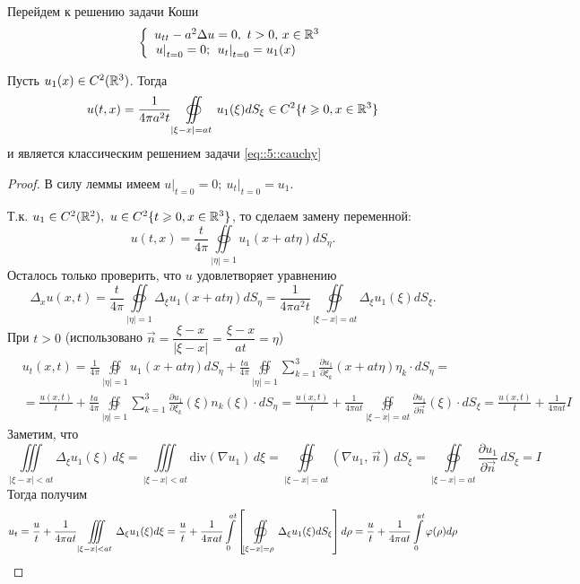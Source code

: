 \documentclass[../main.tex]{subfiles}
\begin{document}
Перейдем к решению задачи Коши
\begin{equation}
\left\{
  \begin{array}{ll}
  u_{tt}-a^2\Delta u=0,\ t>0,\, x\in \R^3\\
  \left. u\right|_{t=0}=0;\ \left. u_t\right|_{t=0}=u_1(x)
  \end{array}
\right.
\label{eq::5::cauchy}
\end{equation}
\begin{theorem}
Пусть $u_1(x)\in C^2(\R^3)$. Тогда 
\[
u(t,x)=\frac{1}{4\pi a^2t}\oiint\limits_{|\xi - x|=at}u_1(\xi )dS_{\xi}\in C^2\{t\geq 0, x\in \R^3 \}
\]
и является классическим решением задачи \eqref{eq::5::cauchy}
\end{theorem}
\begin{proof}
В силу леммы имеем $\left. u\right|_{t=0}=0;\ \left. u_t\right|_{t=0}=u_1$.

Т.к. $u_1\in C^2(\R^2),\ u\in C^2\{t\geq 0, x\in\R^3\}$, то сделаем замену переменной:
\[
u(t, x)=\frac{t}{4\pi}\oiint\limits_{|\eta |=1}u_1(x+at\eta )dS_{\eta}.
\]
Осталось только проверить, что $u$ удовлетворяет уравнению
\[
\Delta_xu(x, t)=\frac{t}{4\pi}\oiint\limits_{|\eta |=1}\Delta_{\xi}u_1(x+at\eta )dS_{\eta}=\frac{1}{4\pi a^2t}\oiint\limits_{|\xi - x|=at}\Delta_{\xi}u_1(\xi )dS_{\xi}.
\]
При $t>0$ (использовано $\vec{n}=\dfrac{\xi - x}{|\xi - x|}=\dfrac{\xi - x}{at}=\eta$)
\begin{equation*}
\begin{split}
&u_t(x,t)=\frac{1}{4\pi}\oiint\limits_{|\eta |=1}u_1(x+at\eta )dS_{\eta}+\frac{ta}{4\pi}\oiint\limits_{|\eta |=1}\sum\limits_{k=1}^3 \frac{\partial u_1}{\partial \xi_k}(x+at\eta )\eta_k\cdot dS_{\eta}=\\[0.75em]
&=\frac{u(x, t)}{t}+\frac{ta}{4\pi}\oiint\limits_{|\eta |=1}\sum\limits_{k=1}^3 \frac{\partial u_1}{\partial \xi_k}(\xi )n_k(\xi )\cdot dS_{\eta}=\frac{u(x, t)}{t}+\frac{1}{4\pi at}\oiint\limits_{|\xi - x |=at}\frac{\partial u_1}{\partial \vec{n}}(\xi )\cdot dS_{\xi}=\frac{u(x, t)}{t} + \frac{1}{4\pi at}I
\end{split}
\end{equation*}
Заметим, что
\[
\iiint\limits_{|\xi - x|<at}\Delta_{\xi}u_1(\xi)\, d\xi =\iiint\limits_{|\xi - x|<at}\mathrm{div} (\nabla u_1)\, d\xi =\oiint\limits_{|\xi - x|=at} (\nabla u_1,\, \vec{n})\, dS_{\xi }=\oiint\limits_{|\xi - x|=at}\frac{\partial u_1}{\partial\vec{n}}\, dS_{\xi }=I
\]
Тогда получим 
$$
u_t=\frac{u}{t}+\frac{1}{4\pi at}\iiint\limits_{|\xi - x|<at}\Delta_{\xi}u_1(\xi )d\xi \\
= \frac{u}{t}+\frac{1}{4\pi at}\int\limits_0^{at} \left[\oiint\limits_{|\xi - x|=\rho}\Delta_{\xi}u_1(\xi )dS_{\xi}\right]d\rho \\
= \frac{u}{t}+\frac{1}{4\pi at}\int\limits_0^{at}\phi (\rho )d\rho
$$


\end{proof}
\end{document}
